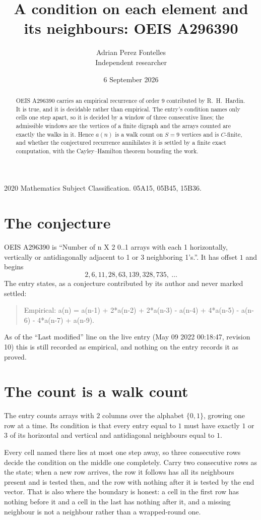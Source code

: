 \documentclass[11pt,a4paper]{article}
\title{A condition on each element and its neighbours: OEIS A296390}
\author{Adrian Perez Fontelles\\ \small Independent researcher}
\date{6 September 2026}
\theoremstyle{plain}
\theoremstyle{definition}
\begin{document}
\maketitle

\begin{abstract}
OEIS A296390 carries an empirical recurrence of order $9$ contributed by R.~H.~Hardin. It is
true, and it is decidable rather than empirical. The entry's condition names only cells one step apart, so it is decided by a window of
three consecutive lines; the
admissible windows are the vertices of a finite digraph and the arrays counted are exactly the
walks in it. Hence $a(n)$ is a walk count on $S=9$ vertices and is $C$-finite, and whether the
conjectured recurrence annihilates it is settled by a finite exact computation, with the
Cayley--Hamilton theorem bounding the work.
\end{abstract}

\noindent\small 2020 Mathematics Subject Classification. 05A15, 05B45, 15B36.\normalsize

\section{The conjecture}

OEIS A296390 is ``Number of n X 2 0..1 arrays with each 1 horizontally, vertically or antidiagonally adjacent to 1 or 3 neighboring 1's.''. It has offset $1$ and begins
\[
2, 6, 11, 28, 63, 139, 328, 735,\ \dots
\]
The entry states, as a conjecture contributed by its author and never marked settled:
\begin{quote}
Empirical: a(n) = a(n-1) + 2*a(n-2) + 2*a(n-3) - a(n-4) + 4*a(n-5) - a(n-6) - 4*a(n-7) + a(n-9).
\end{quote}
As of the ``Last modified'' line on the live entry (May 09 2022 00:18:47, revision 10) this is still
recorded as empirical, and nothing on the entry records it as proved.

\section{The count is a walk count}

The entry counts arrays with $2$ columns over the alphabet $\{0,1\}$, growing one row at a time. Its condition is that every entry equal to $1$ must have exactly $1$ or $3$ of its horizontal and vertical and antidiagonal neighbours equal to $1$.

Every cell named there lies at most one step away, so three consecutive rows decide the condition on the middle one completely. Carry two consecutive rows as the state; when a new row arrives, the row it follows has all its neighbours present and is tested then, and the row with nothing after it is tested by the end vector. That is also where the boundary is honest: a cell in the first row has nothing before it and a cell in the last has nothing after it, and a missing neighbour is not a neighbour rather than a wrapped-round one.
\end{document}
